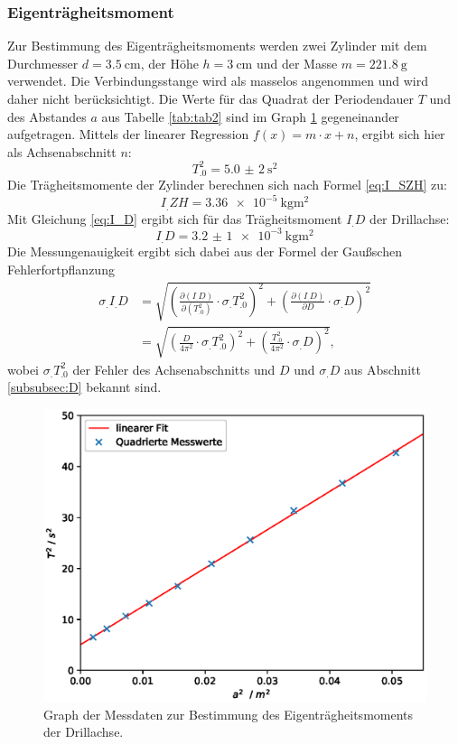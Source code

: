 \subsubsection{Eigenträgheitsmoment}\label{subsubsec:I_D}
Zur Bestimmung des Eigenträgheitsmoments werden zwei Zylinder mit dem Durchmesser $d = \SI{3,5}{\centi\metre}$, der Höhe $h = \SI{3}{\centi\metre}$ und der Masse $m = \SI{221,8}{\gram}$ verwendet.\newline
Die Verbindungsstange wird als masselos angenommen und wird daher nicht berücksichtigt.
Die Werte für das Quadrat der Periodendauer $T$ und des Abstandes $a$ aus Tabelle \ref{tab:tab2} sind im Graph \ref{fig:abb2} gegeneinander aufgetragen. Mittels der linearer Regression $f(x) = m \cdot x + n$\cite{matplotlib}, ergibt sich hier als Achsenabschnitt $n$: \[T_.0^2=\SI{5,0(2)}{\second\squared}\]
Die Trägheitsmomente der Zylinder berechnen sich nach Formel \eqref{eq:I_SZH} zu:
\[I_.{ZH}=\SI{3,36e-5}{\kilogram\metre\squared}\]
Mit Gleichung \eqref{eq:I_D} ergibt sich für das Trägheitsmoment $I_.D$ der Drillachse:
\[I_.D=\SI{3,2(1)e-3}{\kilogram\metre\squared}\]
Die Messungenauigkeit ergibt sich dabei aus der Formel der Gaußschen Fehlerfortpflanzung
\begin{align*}
\sigma_.{I_.D}	&= \sqrt{\left(\frac{\partial (I_.D)}{\partial (T^2_.0)} \cdot \sigma_.{T^2_.0}\right)^2+\left(\frac{\partial (I_.D)}{\partial D}\cdot\sigma_.D\right)^2}\\
				&= \sqrt{\left(\frac{D}{4\pi^2}\cdot\sigma_.{T^2_.0}\right)^2+\left(\frac{T^2_.0}{4\pi^2}\cdot\sigma_.D\right)^2},
\end{align*}
wobei $\sigma_.{T^2_.0}$ der Fehler des Achsenabschnitts und $D$ und $\sigma_.D$ aus Abschnitt \ref{subsubsec:D} bekannt sind.
\begin{figure}
\centering
\includegraphics[scale = .75,keepaspectratio]
	{content/images/plot1.eps}
\caption{Graph der Messdaten zur Bestimmung des Eigenträgheitsmoments der Drillachse.}\label{fig:abb2}
\end{figure}

